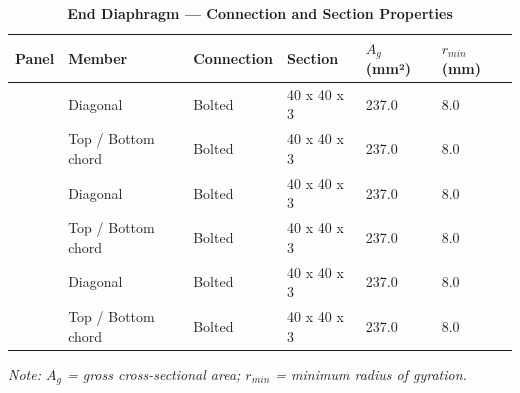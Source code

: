 \documentclass[12pt,a4paper]{report}
\numberwithin{table}{chapter}
\numberwithin{figure}{chapter}
\begin{document}
\begin{longtable}{|C{2.0cm}|L{2.0cm}|L{2.2cm}|C{2.5cm}|C{2.0cm}|C{2.0cm}|}
\caption{\textbf{End Diaphragm --- Connection and Section Properties}}\\
\hline
\textbf{Panel} & \textbf{Member} & \textbf{Connection} & \textbf{Section} & \textbf{$A_g$ (mm²)} & \textbf{$r_{min}$ (mm)} \\[6pt]
\hline
{} & Diagonal & Bolted & 40 x 40 x 3 & 237.0 & 8.0 \\[6pt]
 & Top / Bottom chord & Bolted & 40 x 40 x 3 & 237.0 & 8.0 \\[6pt]
\hline
{} & Diagonal & Bolted & 40 x 40 x 3 & 237.0 & 8.0 \\[6pt]
 & Top / Bottom chord & Bolted & 40 x 40 x 3 & 237.0 & 8.0 \\[6pt]
\hline
{} & Diagonal & Bolted & 40 x 40 x 3 & 237.0 & 8.0 \\[6pt]
 & Top / Bottom chord & Bolted & 40 x 40 x 3 & 237.0 & 8.0 \\[6pt]
\hline
\end{longtable}
\noindent\textit{Note: $A_g$ = gross cross-sectional area; $r_{min}$ = minimum radius of gyration.}
\end{document}
